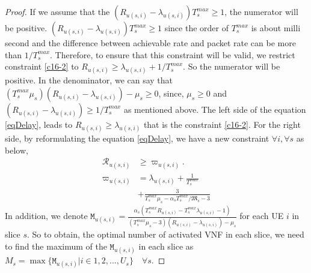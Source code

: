 \documentclass[lettersize,journal]{IEEEtran}
\begin{document}
\begin{proof}
If we assume that the $(R_{u(s,i)}-\lambda_{u(s,i)})T^{max}_s \geq 1$, the numerator will be positive.
$(R_{u(s,i)}-\lambda_{u(s,i)})T^{max}_s \geq 1$ since the order of $T^{max}_s$ is about milli second and the difference between achievable rate and packet rate can be more than $1/T^{max}_s$.
Therefore, to ensure that this constraint will be valid, we restrict constraint \eqref{c16-2} to $R_{u(s,i)} \geq \lambda_{u(s,i)} + 1/T^{max}_s$.
So the numerator will be positive.
In the denominator, we can say that $(T^{max}_s\mu_s)(R_{u(s,i)}-\lambda_{u(s,i)}) - \mu_s \geq 0 $, since,  
$\mu_s \geq 0$ and
$(R_{u(s,i)}-\lambda_{u(s,i)}) \geq 1/T^{max}_s$ as mentioned above.
The left side of the equation \eqref{eqDelay}, leads to $R_{u(s,i)} \geq \lambda_{u(s,i)}$ that is the constraint \eqref{c16-2}. 
For the right side, by reformulating the equation \eqref{eqDelay}, we have a new constraint $\forall i, \forall s$ as below,
\begin{subequations}\label{RM}
\begin{alignat}{4}
\mathcal{R}_{u(s,i)} &\geq \varpi_{u(s,i)}. \\
\varpi_{u(s,i)} &= \lambda_{u(s,i)} + \frac{1}{T^{max}_s}\\
& + \frac{3}{T^{max}_s\mu_s-\alpha_s T^{max}_s/\mathfrak{M}_s-3}
\end{alignat}
\end{subequations}
In addition, we denote $\mathtt{M}_{u(s,i)} = \frac{\alpha_s(T^{max}_s R_{u(s,i)}-T^{max}_s\lambda_{u(s,i)} -1)}{(T^{max}_s\mu_s-3)(R_{u(s,i)}-\lambda_{u(s,i)}) - \mu_s }$ for each UE $i$ in slice $s$.
So to obtain, the optimal number of activated VNF in each slice, we need to find the maximum of the
$\mathtt{M}_{u(s,i)}$ in each slice as $M_s = \max\{\mathtt{M}_{u(s,i)} | i \in 1,2,..., U_s\} \quad \forall s $.
\end{proof}
\end{document}
